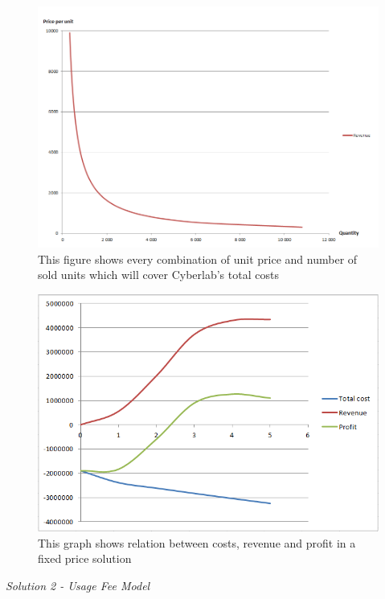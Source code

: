 \begin{figure}
\label{fig:RelationPriceAndUnits}
\includegraphics[scale=0.6]{relationpriceandunits}
\caption[Relation between price per unit and number of sold units]{This figure shows every combination of unit price and number of sold units which will cover Cyberlab's total costs}
\end{figure}
\begin{figure}
\begin{center}
\includegraphics[scale=0.8]{profitfixed}
\caption[Profit, Revenue and Cost for a Fixed Price Solution]{This graph shows relation between costs, revenue and profit in a fixed price solution}
\label{fig:ProfitFixed}
\end{center}
\end{figure}
\emph{Solution 2 - Usage Fee Model}\\ \\
